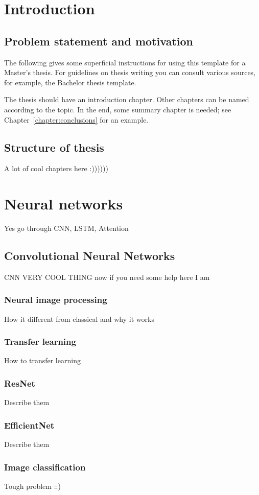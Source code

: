 \chapter{Introduction}
\section{Problem statement and motivation}
The following gives some superficial instructions for using this template for a Master's thesis. For guidelines on thesis writing you can consult various sources, for example, the Bachelor thesis template.

The thesis should have an introduction chapter. Other chapters can be named according to the topic. In the end, some summary chapter is needed; see Chapter~\ref{chapter:conclusions} for an example.

\section{Structure of thesis}
A lot of cool chapters here :))))))

\chapter{Neural networks}
Yes go through CNN, LSTM, Attention
\section{Convolutional Neural Networks}
CNN VERY COOL THING now if you need some help here I am
\subsection{Neural image processing}
How it different from classical and why it works
\subsection{Transfer learning}
How to transfer learning
\subsection{ResNet}
Describe them
\subsection{EfficientNet}
Describe them
\subsection{Image classification}
Tough problem ::)
